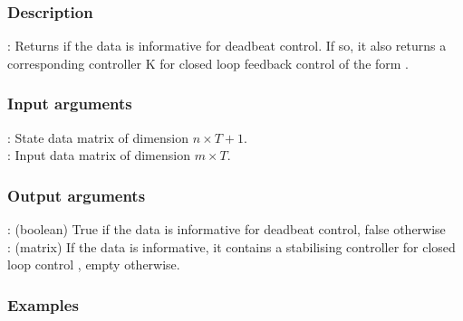 \subsubsection*{Description}
: Returns if the data is informative for deadbeat control. If so, it also returns a corresponding controller K for closed loop feedback control of the form .

\subsubsection*{Input arguments}
\textbf{}: State data matrix of dimension $n \times T+1$.\\
\textbf{}: Input data matrix of dimension $m \times T$.

\subsubsection*{Output arguments}
\textbf{}: (boolean) True if the data is informative for deadbeat control, false otherwise\\
\textbf{}: (matrix) If the data is informative, it contains a stabilising controller  for closed loop control , empty otherwise.

\subsubsection{Examples}